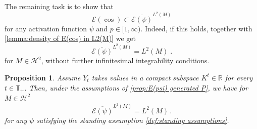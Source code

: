 \documentclass[11pt]{report}
\theoremstyle{plain} %
\newtheorem{proposition}[proposition]{Proposition}
\theoremstyle{definition} %
\theoremstyle{remark} %
\begin{document}
The remaining task is to show that
\begin{equation}
    \mathcal{E}(\cos)\subset \overline{\mathcal{E}(\psi)}^{L^2(M)}
\end{equation}
for any activation function \(\psi\) and \(p\in[1,\infty)\). Indeed, if this holds, together with \cref{lemma:density of E(cos) in L2(M)} we get 
\begin{equation}
    \overline{\mathcal{E}(\psi)}^{L^2(M)}=L^2(M)\;.
\end{equation}
for \(M\in\mathcal{H}^2\), without further infinitesimal integrability conditions. 
\begin{proposition}\label{prop:density of E(psi) in L^2(M)}
    Assume \(Y_t\) takes values in a compact subspace \(K^t\in\mathbb{R}\) for every \(t\in\mathbb{T}_+\). Then, under the assumptions of \cref{prop:E(psi) generated P}, we have for \(M\in\mathcal{H}^2\)
    \begin{equation}
        \overline{\mathcal{E}(\psi)}^{L^2(M)}=L^2(M)\,.
    \end{equation}
    for any \(\psi\) satisfying the standing assumption \cref{def:standing assumptions}.
\end{proposition}
\end{document}

